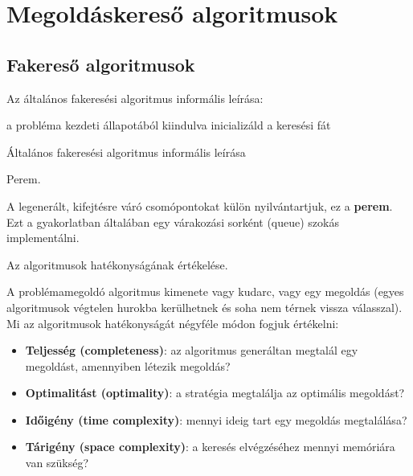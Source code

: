 \section{Megoldáskereső algoritmusok}

\subsection{Fakereső algoritmusok}

Az általános fakeresési algoritmus informális leírása:

\begin{algorithm}[H]
    {
        a probléma kezdeti állapotából kiindulva inicializáld
        a keresési fát \;
    }
    \caption{Általános fakeresési algoritmus informális leírása}
\end{algorithm}

\begin{definicio}
    Perem.

    A legenerált, kifejtésre váró csomópontokat külön nyilvántartjuk, ez a {\bf
    perem}. Ezt a gyakorlatban általában egy várakozási sorként (queue) szokás
    implementálni.
\end{definicio}

\begin{definicio}
    Az algoritmusok hatékonyságának értékelése.

    A problémamegoldó algoritmus kimenete vagy kudarc, vagy egy megoldás (egyes
    algoritmusok végtelen hurokba kerülhetnek és soha nem térnek vissza válasszal).
    Mi az algoritmusok hatékonyságát négyféle módon fogjuk értékelni:
    \begin{itemize}
        \item {\bf Teljesség (completeness)}: az algoritmus generáltan megtalál
            egy megoldást, amennyiben létezik megoldás?
        \item {\bf Optimalitást (optimality)}: a stratégia megtalálja az optimális megoldást?
        \item {\bf Időigény (time complexity)}: mennyi ideig tart egy megoldás megtalálása?
        \item {\bf Tárigény (space complexity)}: a keresés elvégzéséhez mennyi
            memóriára van szükség?
    \end{itemize}
\end{definicio}

